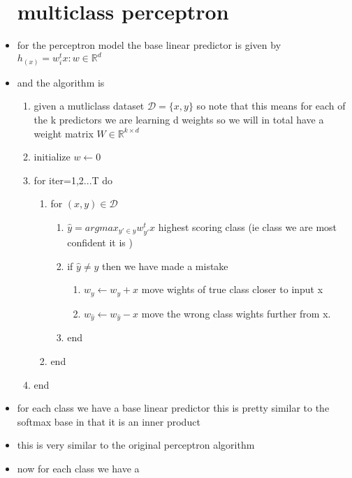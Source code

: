 \documentclass{article}
\begin{document}
\begin{itemize}
\section*{multiclass perceptron }
\item for the perceptron model the base linear predictor is given by $h_(x)=w_i^{t}x:w\in \mathbb{R}^{d}$
\item and the algorithm is 
\begin{enumerate}
    \item given a mutliclass dataset $\mathcal{D}=\{x,y\}$ so note that this means for each of the k predictors we are learning d weights so we will in total have a weight matrix $W\in \mathbb{R}^{k \times d }$
    \item initialize $w\leftarrow 0$
    \item for iter=1,2...T do
    \begin{enumerate}
        \item for $(x,y)\in \mathcal{D}$
        \begin{enumerate}
        \item $\hat{y}=argmax_{y'\in y}w^t_{y'}x$ highest scoring class (ie class we are most confident it is )
        \item if $\hat{y}\neq y$ then we have made a mistake  
        \begin{enumerate}
            \item $w_{y}\leftarrow w_y+x$ move wights of true class closer to input x  
            \item $w_{\hat{y}}\leftarrow w_{\hat{y}}-x$ move the wrong class wights further from x.
        \end{enumerate}
        \item end 
    \end{enumerate}
    \item end 
    \end{enumerate}
    \item end 
\end{enumerate}
\item for each class we have a base linear predictor this is pretty similar to the softmax base in that it is an inner product
\item this is very similar to the original perceptron algorithm
\item now for each class we have a 

\end{itemize}
\end{document}
